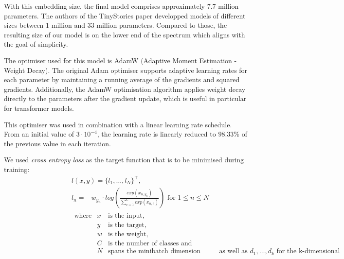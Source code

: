 \documentclass[11pt]{article}
\begin{document}
    With this embedding size, the final model comprises approximately 7.7 million parameters. The authors of the TinyStories paper developped models of different sizes between 1 million and 33 million parameters.
    Compared to those, the resulting size of our model is on the lower end of the spectrum which aligns with the goal of simplicity.

    The optimiser used for this model is AdamW (Adaptive Moment Estimation - Weight Decay). The original Adam optimiser supports adaptive learning rates for each parameter by maintaining a running average of the gradients and squared gradients.
    Additionally, the AdamW optimisation algorithm applies weight decay directly to the parameters after the gradient update, which is useful in particular for transformer models. \cite{adam}

    This optimiser was used in combination with a linear learning rate schedule. From an initial value of $3 \cdot 10^{-4}$, the learning rate is linearly reduced to $98.33 \%$ of the previous value in each iteration. %

    We used \textit{cross entropy loss} as the target function that is to be minimised during training:
    $$
    \begin{array}{l}
        \phantom{\hspace{4cm}}l(x, y) = \{ l_1, \ldots, l_N\}^{\top},\\
        \phantom{\hspace{4cm}}l_n = -w_{y_n} \cdot log \left( \displaystyle{\frac{exp(x_{n, y_n})}{\sum_{c = 1}^C exp(x_{n, c})}} \right) \textrm{ for } 1 \leq n \leq N \\
    \begin{array}{rll}
        \phantom{\hspace{4cm}}\textrm{where} & x & \textrm{is the input,} \\
        \phantom{\hspace{4cm}}& y & \textrm{is the target,} \\
        \phantom{\hspace{4cm}}& w & \textrm{is the weight,} \\
        \phantom{\hspace{4cm}}& C & \textrm{is the number of classes and} \\
        \phantom{\hspace{4cm}}& N & \textrm{spans the minibatch dimension}
        \phantom{\hspace{4cm}}& & & \textrm{as well as } d_1, \ldots, d_k \textrm{ for the k-dimensional case} \\
    \end{array}
    \end{array}
    $$
\end{document}
